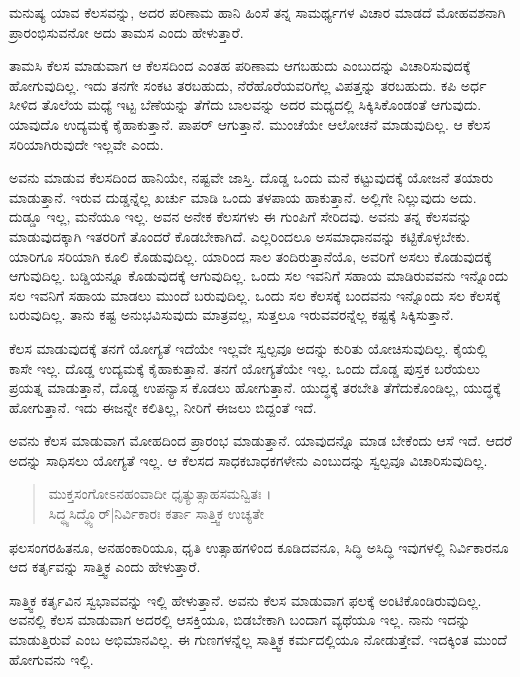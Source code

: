 {\small ಮನುಷ್ಯ ಯಾವ ಕೆಲಸವನ್ನು, ಅದರ ಪರಿಣಾಮ ಹಾನಿ ಹಿಂಸೆ ತನ್ನ ಸಾಮರ್ಥ್ಯಗಳ ವಿಚಾರ ಮಾಡದೆ ಮೋಹವಶನಾಗಿ ಪ್ರಾರಂಭಿಸುವನೋ ಅದು ತಾಮಸ ಎಂದು ಹೇಳುತ್ತಾರೆ.}

ತಾಮಸಿ ಕೆಲಸ ಮಾಡುವಾಗ ಆ ಕೆಲಸದಿಂದ ಎಂತಹ ಪರಿಣಾಮ ಆಗಬಹುದು ಎಂಬುದನ್ನು ವಿಚಾರಿಸುವುದಕ್ಕೆ ಹೋಗುವುದಿಲ್ಲ. ಇದು ತನಗೇ ಸಂಕಟ ತರಬಹುದು, ನೆರೆಹೊರೆಯವರಿಗೆಲ್ಲ ವಿಪತ್ತನ್ನು ತರಬಹುದು. ಕಪಿ ಅರ್ಧ ಸೀಳಿದ ತೊಲೆಯ ಮಧ್ಯೆ ಇಟ್ಟ ಬೆಣೆಯನ್ನು ತೆಗೆದು ಬಾಲವನ್ನು ಅದರ ಮಧ್ಯದಲ್ಲಿ ಸಿಕ್ಕಿಸಿಕೊಂಡಂತೆ ಆಗುವುದು. ಯಾವುದೊ ಉದ್ಯಮಕ್ಕೆ ಕೈಹಾಕುತ್ತಾನೆ. ಪಾಪರ್ ಆಗುತ್ತಾನೆ. ಮುಂಚೆಯೇ ಆಲೋಚನೆ ಮಾಡುವುದಿಲ್ಲ. ಆ ಕೆಲಸ ಸರಿಯಾಗಿರುವುದೇ ಇಲ್ಲವೇ ಎಂದು.

ಅವನು ಮಾಡುವ ಕೆಲಸದಿಂದ ಹಾನಿಯೇ, ನಷ್ಟವೇ ಜಾಸ್ತಿ. ದೊಡ್ಡ ಒಂದು ಮನೆ ಕಟ್ಟುವುದಕ್ಕೆ ಯೋಜನೆ ತಯಾರು ಮಾಡುತ್ತಾನೆ. ಇರುವ ದುಡ್ಡನ್ನೆಲ್ಲ ಖರ್ಚು ಮಾಡಿ ಒಂದು ತಳಪಾಯ ಹಾಕುತ್ತಾನೆ. ಅಲ್ಲಿಗೇ ನಿಲ್ಲುವುದು ಅದು. ದುಡ್ಡೂ ಇಲ್ಲ, ಮನೆಯೂ ಇಲ್ಲ. ಅವನ ಅನೇಕ ಕೆಲಸಗಳು ಈ ಗುಂಪಿಗೆ ಸೇರಿದವು. ಅವನು ತನ್ನ ಕೆಲಸವನ್ನು ಮಾಡುವುದಕ್ಕಾಗಿ ಇತರರಿಗೆ ತೊಂದರೆ ಕೊಡಬೇಕಾಗಿದೆ. ಎಲ್ಲರಿಂದಲೂ ಅಸಮಾಧಾನವನ್ನು ಕಟ್ಟಿಕೊಳ್ಳಬೇಕು. ಯಾರಿಗೂ ಸರಿಯಾಗಿ ಕೂಲಿ ಕೊಡುವುದಿಲ್ಲ. ಯಾರಿಂದ ಸಾಲ ತಂದಿರುತ್ತಾನೆಯೊ, ಅವರಿಗೆ ಅಸಲು ಕೊಡುವುದಕ್ಕೆ ಆಗುವುದಿಲ್ಲ. ಬಡ್ಡಿಯನ್ನೂ ಕೊಡುವುದಕ್ಕೆ ಆಗುವುದಿಲ್ಲ. ಒಂದು ಸಲ ಇವನಿಗೆ ಸಹಾಯ ಮಾಡಿರುವವನು ಇನ್ನೊಂದು ಸಲ ಇವನಿಗೆ ಸಹಾಯ ಮಾಡಲು ಮುಂದೆ ಬರುವುದಿಲ್ಲ. ಒಂದು ಸಲ ಕೆಲಸಕ್ಕೆ ಬಂದವನು ಇನ್ನೊಂದು ಸಲ ಕೆಲಸಕ್ಕೆ ಬರುವುದಿಲ್ಲ. ತಾನು ಕಷ್ಟ ಅನುಭವಿಸುವುದು ಮಾತ್ರವಲ್ಲ, ಸುತ್ತಲೂ ಇರುವವರನ್ನೆಲ್ಲ ಕಷ್ಟಕ್ಕೆ ಸಿಕ್ಕಿಸುತ್ತಾನೆ.

ಕೆಲಸ ಮಾಡುವುದಕ್ಕೆ ತನಗೆ ಯೋಗ್ಯತೆ ಇದೆಯೇ ಇಲ್ಲವೇ ಸ್ವಲ್ಪವೂ ಅದನ್ನು ಕುರಿತು ಯೋಚಿಸುವುದಿಲ್ಲ. ಕೈಯಲ್ಲಿ ಕಾಸೇ ಇಲ್ಲ. ದೊಡ್ಡ ಉದ್ಯಮಕ್ಕೆ ಕೈಹಾಕುತ್ತಾನೆ. ತನಗೆ ಯೋಗ್ಯತೆಯೇ ಇಲ್ಲ. ಒಂದು ದೊಡ್ಡ ಪುಸ್ತಕ ಬರೆಯಲು ಪ್ರಯತ್ನ ಮಾಡುತ್ತಾನೆ, ದೊಡ್ಡ ಉಪನ್ಯಾಸ ಕೊಡಲು ಹೋಗುತ್ತಾನೆ. ಯುದ್ಧಕ್ಕೆ ತರಬೇತಿ ತೆಗೆದುಕೊಂಡಿಲ್ಲ, ಯುದ್ಧಕ್ಕೆ ಹೋಗುತ್ತಾನೆ. ಇದು ಈಜನ್ನೇ ಕಲಿತಿಲ್ಲ, ನೀರಿಗೆ ಈಜಲು ಬಿದ್ದಂತೆ ಇದೆ.

ಅವನು ಕೆಲಸ ಮಾಡುವಾಗ ಮೋಹದಿಂದ ಪ್ರಾರಂಭ ಮಾಡುತ್ತಾನೆ. ಯಾವುದನ್ನೊ ಮಾಡ ಬೇಕೆಂದು ಆಸೆ ಇದೆ. ಆದರೆ ಅದನ್ನು ಸಾಧಿಸಲು ಯೋಗ್ಯತೆ ಇಲ್ಲ. ಆ ಕೆಲಸದ ಸಾಧಕಬಾಧಕಗಳೇನು ಎಂಬುದನ್ನು ಸ್ವಲ್ಪವೂ ವಿಚಾರಿಸುವುದಿಲ್ಲ.

\begin{verse}
ಮುಕ್ತಸಂಗೋಽನಹಂವಾದೀ ಧೃತ್ಯುತ್ಸಾಹಸಮನ್ವಿತಃ ।\\ಸಿದ್ಧ್ಯಸಿದ್ಧ್ಯೊರ್|ನಿರ್ವಿಕಾರಃ ಕರ್ತಾ ಸಾತ್ತ್ವಿಕ ಉಚ್ಯತೇ 
\end{verse}

{\small ಫಲಸಂಗರಹಿತನೂ, ಅನಹಂಕಾರಿಯೂ, ಧೃತಿ ಉತ್ಸಾಹಗಳಿಂದ ಕೂಡಿದವನೂ, ಸಿದ್ಧಿ ಅಸಿದ್ಧಿ ಇವುಗಳಲ್ಲಿ ನಿರ್ವಿಕಾರನೂ ಆದ ಕರ್ತೃವನ್ನು ಸಾತ್ತ್ವಿಕ ಎಂದು ಹೇಳುತ್ತಾರೆ.}

ಸಾತ್ತ್ವಿಕ ಕರ್ತೃವಿನ ಸ್ವಭಾವವನ್ನು ಇಲ್ಲಿ ಹೇಳುತ್ತಾನೆ. ಅವನು ಕೆಲಸ ಮಾಡುವಾಗ ಫಲಕ್ಕೆ ಅಂಟಿಕೊಂಡಿರುವುದಿಲ್ಲ. ಅವನಲ್ಲಿ ಕೆಲಸ ಮಾಡುವಾಗ ಅದರಲ್ಲಿ ಆಸಕ್ತಿಯೂ, ಬಿಡಬೇಕಾಗಿ ಬಂದಾಗ ವ್ಯಥೆಯೂ ಇಲ್ಲ. ನಾನು ಇದನ್ನು ಮಾಡುತ್ತಿರುವೆ ಎಂಬ ಅಭಿಮಾನವಿಲ್ಲ. ಈ ಗುಣಗಳನ್ನೆಲ್ಲ ಸಾತ್ತ್ವಿಕ ಕರ್ಮದಲ್ಲಿಯೂ ನೋಡುತ್ತೇವೆ. ಇದಕ್ಕಿಂತ ಮುಂದೆ ಹೋಗುವನು ಇಲ್ಲಿ.

